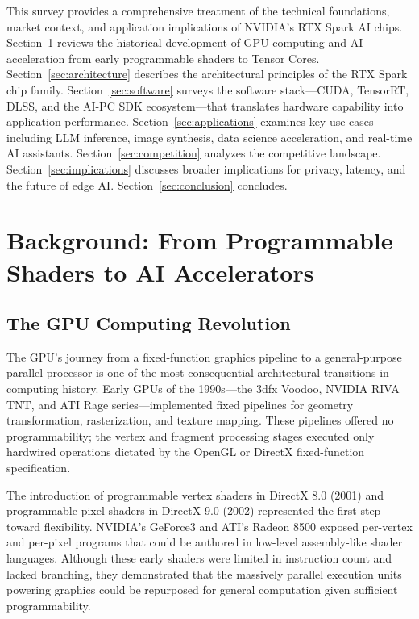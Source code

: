 \documentclass[conference]{IEEEtran}
\begin{document}
This survey provides a comprehensive treatment of the technical foundations, market context, and application implications of NVIDIA's RTX Spark AI chips. Section~\ref{sec:background} reviews the historical development of GPU computing and AI acceleration from early programmable shaders to Tensor Cores. Section~\ref{sec:architecture} describes the architectural principles of the RTX Spark chip family. Section~\ref{sec:software} surveys the software stack---CUDA, TensorRT, DLSS, and the AI-PC SDK ecosystem---that translates hardware capability into application performance. Section~\ref{sec:applications} examines key use cases including LLM inference, image synthesis, data science acceleration, and real-time AI assistants. Section~\ref{sec:competition} analyzes the competitive landscape. Section~\ref{sec:implications} discusses broader implications for privacy, latency, and the future of edge AI. Section~\ref{sec:conclusion} concludes.

\section{Background: From Programmable Shaders to AI Accelerators}
\label{sec:background}

\subsection{The GPU Computing Revolution}

The GPU's journey from a fixed-function graphics pipeline to a general-purpose parallel processor is one of the most consequential architectural transitions in computing history. Early GPUs of the 1990s---the 3dfx Voodoo, NVIDIA RIVA TNT, and ATI Rage series---implemented fixed pipelines for geometry transformation, rasterization, and texture mapping. These pipelines offered no programmability; the vertex and fragment processing stages executed only hardwired operations dictated by the OpenGL or DirectX fixed-function specification.

The introduction of programmable vertex shaders in DirectX 8.0 (2001) and programmable pixel shaders in DirectX 9.0 (2002) represented the first step toward flexibility. NVIDIA's GeForce3 and ATI's Radeon 8500 exposed per-vertex and per-pixel programs that could be authored in low-level assembly-like shader languages. Although these early shaders were limited in instruction count and lacked branching, they demonstrated that the massively parallel execution units powering graphics could be repurposed for general computation given sufficient programmability.
\end{document}
